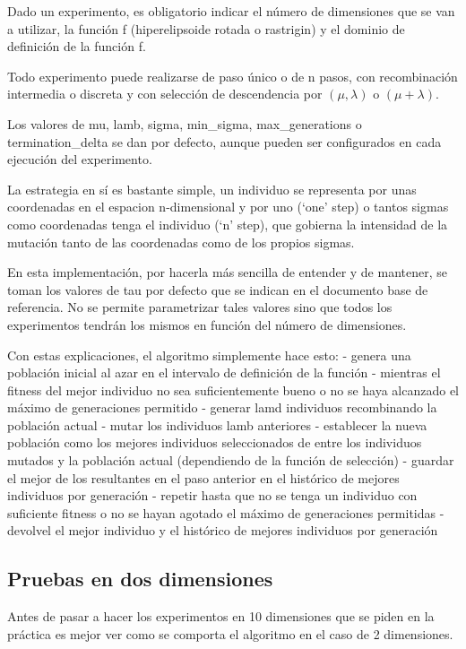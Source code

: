 \documentclass[11pt]{article}
\begin{document}
Dado un experimento, es obligatorio indicar el número de dimensiones que
se van a utilizar, la función f (hiperelipsoide rotada o rastrigin) y el
dominio de definición de la función f.

Todo experimento puede realizarse de paso único o de n pasos, con
recombinación intermedia o discreta y con selección de descendencia por
\((\mu,\lambda)\) o \((\mu + \lambda)\).

Los valores de mu, lamb, sigma, min\_sigma, max\_generations o
termination\_delta se dan por defecto, aunque pueden ser configurados en
cada ejecución del experimento.

La estrategia en sí es bastante simple, un individuo se representa por
unas coordenadas en el espacion n-dimensional y por uno (`one' step) o
tantos sigmas como coordenadas tenga el individuo (`n' step), que
gobierna la intensidad de la mutación tanto de las coordenadas como de
los propios sigmas.

En esta implementación, por hacerla más sencilla de entender y de
mantener, se toman los valores de tau por defecto que se indican en el
documento base de referencia. No se permite parametrizar tales valores
sino que todos los experimentos tendrán los mismos en función del número
de dimensiones.

Con estas explicaciones, el algoritmo simplemente hace esto: - genera
una población inicial al azar en el intervalo de definición de la
función - mientras el fitness del mejor individuo no sea suficientemente
bueno o no se haya alcanzado el máximo de generaciones permitido -
generar lamd individuos recombinando la población actual - mutar los
individuos lamb anteriores - establecer la nueva población como los
mejores individuos seleccionados de entre los individuos mutados y la
población actual (dependiendo de la función de selección) - guardar el
mejor de los resultantes en el paso anterior en el histórico de mejores
individuos por generación - repetir hasta que no se tenga un individuo
con suficiente fitness o no se hayan agotado el máximo de generaciones
permitidas - devolvel el mejor individuo y el histórico de mejores
individuos por generación

\subsection{Pruebas en dos
dimensiones}\label{pruebas-en-dos-dimensiones}

Antes de pasar a hacer los experimentos en 10 dimensiones que se piden
en la práctica es mejor ver como se comporta el algoritmo en el caso de
2 dimensiones.
\end{document}
